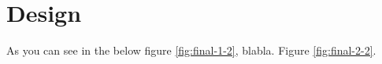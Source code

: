 \section{Design}

As you can see in the below figure \ref{fig:final-1-2}, blabla. Figure
\ref{fig:final-2-2}.



